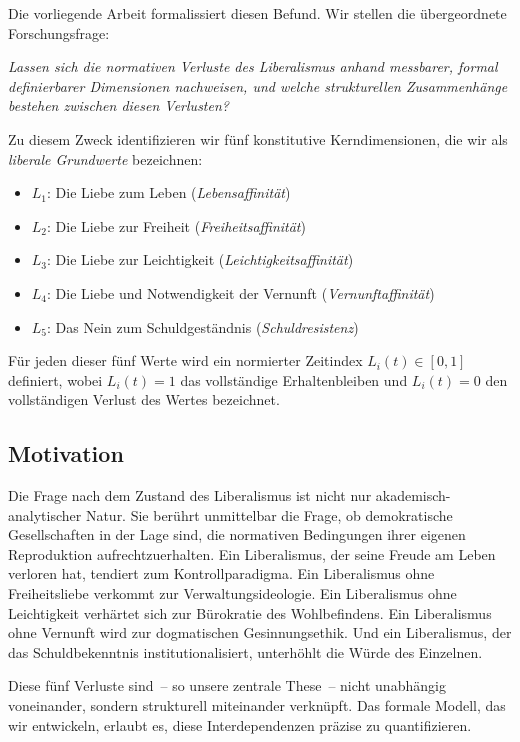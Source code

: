 ﻿\documentclass[a4paper,12pt]{article}
\theoremstyle{definition}
\begin{document}
Die vorliegende Arbeit formalissiert diesen Befund. Wir stellen die übergeordnete Forschungsfrage:

\medskip
\textit{Lassen sich die normativen Verluste des Liberalismus anhand messbarer, formal definierbarer Dimensionen nachweisen, und welche strukturellen Zusammenhänge bestehen zwischen diesen Verlusten?}
\medskip

Zu diesem Zweck identifizieren wir fünf konstitutive Kerndimensionen, die wir als \emph{liberale Grundwerte} bezeichnen:

\begin{itemize}
	\item $L_1$: Die Liebe zum Leben (\emph{Lebensaffinität})
	\item $L_2$: Die Liebe zur Freiheit (\emph{Freiheitsaffinität})
	\item $L_3$: Die Liebe zur Leichtigkeit (\emph{Leichtigkeitsaffinität})
	\item $L_4$: Die Liebe und Notwendigkeit der Vernunft (\emph{Vernunftaffinität})
	\item $L_5$: Das Nein zum Schuldgeständnis (\emph{Schuldresistenz})
\end{itemize}

Für jeden dieser fünf Werte wird ein normierter Zeitindex $L_i(t) \in [0,1]$ definiert, wobei $L_i(t) = 1$ das vollständige Erhaltenbleiben und $L_i(t) = 0$ den vollständigen Verlust des Wertes bezeichnet.

\subsection{Motivation}

Die Frage nach dem Zustand des Liberalismus ist nicht nur akademisch-analytischer Natur. Sie berührt unmittelbar die Frage, ob demokratische Gesellschaften in der Lage sind, die normativen Bedingungen ihrer eigenen Reproduktion aufrechtzuerhalten. Ein Liberalismus, der seine Freude am Leben verloren hat, tendiert zum Kontrollparadigma. Ein Liberalismus ohne Freiheitsliebe verkommt zur Verwaltungsideologie. Ein Liberalismus ohne Leichtigkeit verhärtet sich zur Bürokratie des Wohlbefindens. Ein Liberalismus ohne Vernunft wird zur dogmatischen Gesinnungsethik. Und ein Liberalismus, der das Schuldbekenntnis institutionalisiert, unterhöhlt die Würde des Einzelnen.

Diese fünf Verluste sind~-- so unsere zentrale These~-- nicht unabhängig voneinander, sondern strukturell miteinander verknüpft. Das formale Modell, das wir entwickeln, erlaubt es, diese Interdependenzen präzise zu quantifizieren.
\end{document}
